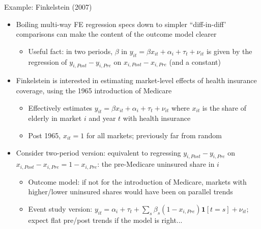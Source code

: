 \documentclass[11pt, english]{beamer}
\begin{document}
	\begin{frame}{Example: Finkelstein (2007)}
		\begin{itemize}
			\item Boiling multi-way FE regression specs down to simpler ``diff-in-diff'
				comparisons can make the content of the outcome model clearer
				\smallskip
				\begin{itemize}
					\item Useful fact: in two periods, $\beta$ in $y_{it}=\beta x_{it}+\alpha
						_{i}+\tau_{t}+\nu_{it}$ is given by the regression of $y_{i,Post}-y_{i,Pre}$
						on $x_{i,Post}-x_{i,Pre}$ (and a constant)
				\end{itemize}
				\medskip
				\pause{}

			\item Finkelstein is interested in estimating market-level effects of health
				insurance coverage, using the 1965 introduction of Medicare
				\smallskip
				\pause{}
				\begin{itemize}
					\item Effectively estimates $y_{it}=\beta x_{it}+\alpha_{i}+\tau_{t}+\nu
						_{it}$ where $x_{it}$ is the share of elderly in market $i$ and year
						$t$ with health insurance
						\smallskip
						\pause{}

					\item Post 1965, $x_{it}=1$ for all markets; previously far from random
				\end{itemize}
				\medskip
				\pause{}

			\item Consider two-period version: equivalent to regressing
				$y_{i,Post}-y_{i,Pre}$ on $x_{i,Post}-x_{i,Pre}=1-x_{i,Pre}$: the pre-Medicare
				uninsured share in $i$
				\smallskip
				\pause{}
				\begin{itemize}
					\item Outcome model: if not for the introduction of Medicare, markets with
						higher/lower uninsured shares would have been on parallel trends
						\smallskip
						\pause{}

					\item Event study version:
						$y_{it}= \alpha_{i} + \tau_{t} + \sum_{s}\beta_{s} (1-x_{i,Pre}) \mathbf{1}
						[t=s] + \nu_{it}$; expect flat pre/post trends if the model is right...
				\end{itemize}
		\end{itemize}
	\end{frame}
\end{document}
